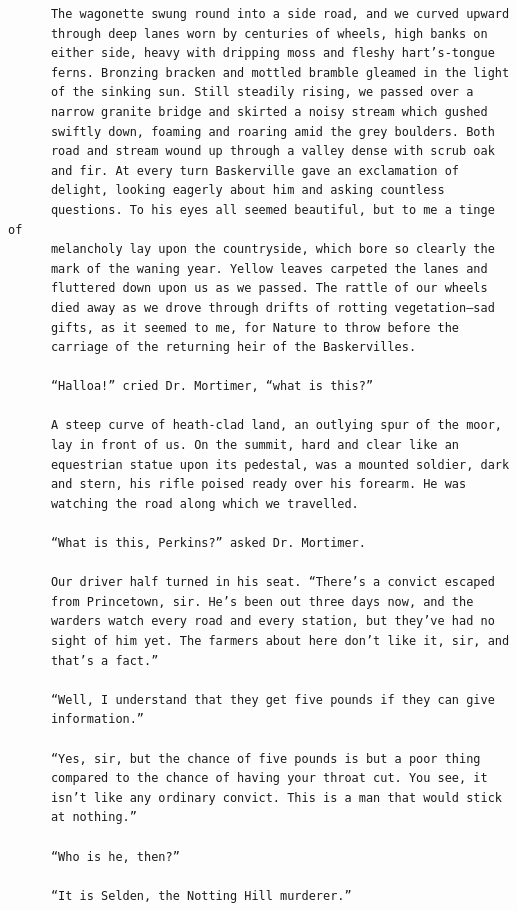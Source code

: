\documentclass{article}
\begin{document}
\begin{verbatim}
      The wagonette swung round into a side road, and we curved upward
      through deep lanes worn by centuries of wheels, high banks on
      either side, heavy with dripping moss and fleshy hart’s-tongue
      ferns. Bronzing bracken and mottled bramble gleamed in the light
      of the sinking sun. Still steadily rising, we passed over a
      narrow granite bridge and skirted a noisy stream which gushed
      swiftly down, foaming and roaring amid the grey boulders. Both
      road and stream wound up through a valley dense with scrub oak
      and fir. At every turn Baskerville gave an exclamation of
      delight, looking eagerly about him and asking countless
      questions. To his eyes all seemed beautiful, but to me a tinge of
      melancholy lay upon the countryside, which bore so clearly the
      mark of the waning year. Yellow leaves carpeted the lanes and
      fluttered down upon us as we passed. The rattle of our wheels
      died away as we drove through drifts of rotting vegetation—sad
      gifts, as it seemed to me, for Nature to throw before the
      carriage of the returning heir of the Baskervilles.

      “Halloa!” cried Dr. Mortimer, “what is this?”

      A steep curve of heath-clad land, an outlying spur of the moor,
      lay in front of us. On the summit, hard and clear like an
      equestrian statue upon its pedestal, was a mounted soldier, dark
      and stern, his rifle poised ready over his forearm. He was
      watching the road along which we travelled.

      “What is this, Perkins?” asked Dr. Mortimer.

      Our driver half turned in his seat. “There’s a convict escaped
      from Princetown, sir. He’s been out three days now, and the
      warders watch every road and every station, but they’ve had no
      sight of him yet. The farmers about here don’t like it, sir, and
      that’s a fact.”

      “Well, I understand that they get five pounds if they can give
      information.”

      “Yes, sir, but the chance of five pounds is but a poor thing
      compared to the chance of having your throat cut. You see, it
      isn’t like any ordinary convict. This is a man that would stick
      at nothing.”

      “Who is he, then?”

      “It is Selden, the Notting Hill murderer.”


\end{verbatim}
\end{document}
